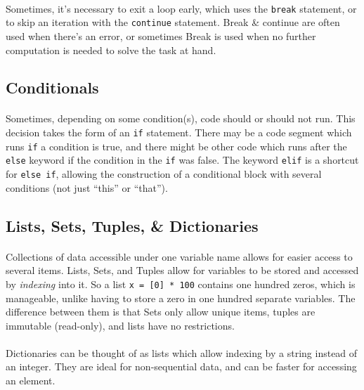 \documentclass[letter,10pt]{article}
\begin{document}
\paragraph{}Sometimes, it's necessary to exit a loop early, which uses the \verb|break| statement, or to skip an iteration with the \verb|continue| statement. Break \& continue are often used when there's an error, or sometimes Break is used when no further computation is needed to solve the task at hand.

\subsection{Conditionals}
\paragraph{}Sometimes, depending on some condition(s), code should or should not run. This decision takes the form of an \verb|if| statement. There may be a code segment which runs \verb|if| a condition is true, and there might be other code which runs after the \verb|else| keyword if the condition in the \verb|if| was false. The keyword \verb|elif| is a shortcut for \verb|else if|, allowing the construction of a conditional block with several conditions (not just ``this'' or ``that'').

\subsection{Lists, Sets, Tuples, \& Dictionaries}
\paragraph{}Collections of data accessible under one variable name allows for easier access to several items. Lists, Sets, and Tuples allow for variables to be stored and accessed by \textit{indexing} into it. So a list \verb|x = [0] * 100| contains one hundred zeros, which is manageable, unlike having to store a zero in one hundred separate variables. The difference between them is that Sets only allow unique items, tuples are immutable (read-only), and lists have no restrictions.

\paragraph{}Dictionaries can be thought of as lists which allow indexing by a string instead of an integer. They are ideal for non-sequential data, and can be faster for accessing an element.
\end{document}

